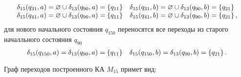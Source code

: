 \begin{enumerate}
\begin{align*}
		      \begin{array}{ll}
			      \delta_{15}(q_{31}, a) = \varnothing \cup \delta_{13}(q_{90}, a) = \left\{q_{11}\right\} & \delta_{15}(q_{31}, b) = \varnothing \cup \delta_{13}(q_{90}, b) = \left\{q_{21}\right\}  \\
			      \delta_{15}(q_{41}, a) = \varnothing \cup \delta_{13}(q_{90}, a) = \left\{q_{11}\right\} & \delta_{15}(q_{41}, b) = \varnothing \cup \delta_{13}(q_{90}, b) = \left\{q_{21}\right\},
		      \end{array}
	      \end{align*}
	      для нового начального состояния \(q_{150}\) переносятся все переходы из старого началльного состояния \(q_{90}\)
	      \begin{align*}
		      \begin{array}{ll}
			      \delta_{15}(q_{150}, a)  = \delta_{13}(q_{90}, a) = \left\{q_{11}\right\} & \delta_{15}(q_{150}, b)  =  \delta_{13}(q_{90}, b) = \left\{q_{21}\right\}.
		      \end{array}
	      \end{align*}
\end{enumerate}
Граф переходов построенного КА \(M_{15}\) примет вид:
